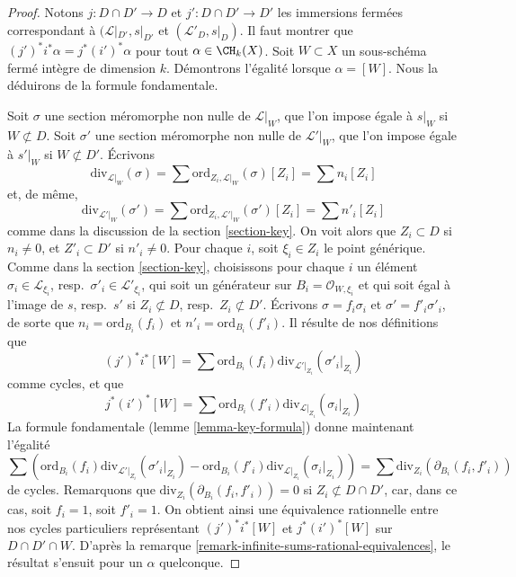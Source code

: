 \begin{proof}
Notons $j : D \cap D' \to D$ et $j' : D \cap D' \to D'$ les immersions
fermées correspondant à $(\mathcal{L}|_{D'}, s|_{D'}$ et
$(\mathcal{L}'_D, s|_D)$. Il faut montrer que
$(j')^*i^*\alpha = j^* (i')^*\alpha$ pour tout $\alpha \in \CH_k(X)$.
Soit $W \subset X$ un sous-schéma fermé intègre de dimension $k$.
Démontrons l'égalité lorsque $\alpha = [W]$. Nous la déduirons
de la formule fondamentale.

\medskip\noindent
Soit $\sigma$ une section méromorphe non nulle de $\mathcal{L}|_W$,
que l'on impose égale à $s|_W$ si $W \not \subset D$.
Soit $\sigma'$ une section méromorphe non nulle de $\mathcal{L}'|_W$,
que l'on impose égale à $s'|_W$ si $W \not \subset D'$.
Écrivons
$$
\text{div}_{\mathcal{L}|_W}(\sigma) =
\sum \text{ord}_{Z_i, \mathcal{L}|_W}(\sigma)[Z_i] = \sum n_i[Z_i]
$$
et, de même,
$$
\text{div}_{\mathcal{L}'|_W}(\sigma') =
\sum \text{ord}_{Z_i, \mathcal{L}'|_W}(\sigma')[Z_i] = \sum n'_i[Z_i]
$$
comme dans la discussion de la section \ref{section-key}.
On voit alors que $Z_i \subset D$ si $n_i \not = 0$, et
$Z'_i \subset D'$ si $n'_i \not = 0$. Pour chaque $i$, soit $\xi_i \in Z_i$
le point générique. Comme dans la section \ref{section-key}, choisissons
pour chaque $i$ un élément
$\sigma_i \in \mathcal{L}_{\xi_i}$, resp.\ $\sigma'_i \in \mathcal{L}'_{\xi_i}$,
qui soit un générateur sur $B_i = \mathcal{O}_{W, \xi_i}$
et qui soit égal à l'image de
$s$, resp.\ $s'$ si $Z_i \not \subset D$, resp.\ $Z_i \not \subset D'$.
Écrivons $\sigma = f_i \sigma_i$ et $\sigma' = f'_i\sigma'_i$, de sorte que
$n_i = \text{ord}_{B_i}(f_i)$ et
$n'_i = \text{ord}_{B_i}(f'_i)$.
Il résulte de nos définitions que
$$
(j')^*i^*[W] =
\sum \text{ord}_{B_i}(f_i) \text{div}_{\mathcal{L}'|_{Z_i}}(\sigma'_i|_{Z_i})
$$
comme cycles, et que
$$
j^*(i')^*[W] =
\sum \text{ord}_{B_i}(f'_i) \text{div}_{\mathcal{L}|_{Z_i}}(\sigma_i|_{Z_i})
$$
La formule fondamentale (lemme \ref{lemma-key-formula}) donne maintenant l'égalité
$$
\sum \left(
\text{ord}_{B_i}(f_i) \text{div}_{\mathcal{L}'|_{Z_i}}(\sigma'_i|_{Z_i}) -
\text{ord}_{B_i}(f'_i) \text{div}_{\mathcal{L}|_{Z_i}}(\sigma_i|_{Z_i})
\right) =
\sum \text{div}_{Z_i}(\partial_{B_i}(f_i, f'_i))
$$
de cycles. Remarquons que $\text{div}_{Z_i}(\partial_{B_i}(f_i, f'_i)) = 0$ si
$Z_i \not \subset D \cap D'$, car, dans ce cas, soit $f_i = 1$,
soit $f'_i = 1$. On obtient ainsi une équivalence rationnelle entre nos cycles
particuliers représentant $(j')^*i^*[W]$ et $j^*(i')^*[W]$ sur $D \cap D' \cap W$.
D'après la remarque \ref{remark-infinite-sums-rational-equivalences},
le résultat s'ensuit pour un $\alpha$ quelconque.
\end{proof}
















